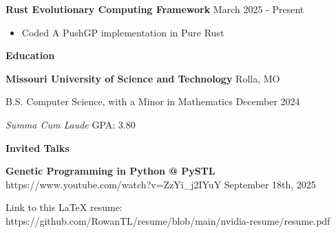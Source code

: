 \documentclass[11pt]{article}
\begin{document}
\textbf{Rust Evolutionary Computing Framework} \hfill March 2025 - Present
\begin{itemize}[noitemsep, topsep=0pt, partopsep=0pt, parsep=0pt, itemsep=0pt]
    \item Coded A PushGP implementation in Pure Rust
\end{itemize}

\begin{center}
    \textbf{Education}
\end{center}
\textbf{Missouri University of Science and Technology} \hfill Rolla, MO

B.S. Computer Science, with a Minor in Mathematics \hfill December 2024

\textit{Summa Cum Laude} \hfill GPA: 3.80

\begin{center}
    \textbf{Invited Talks}
\end{center}

\textbf{Genetic Programming in Python @ PySTL} \tiny{https://www.youtube.com/watch?v=ZzYi\_j2IYuY} \hfill \normalsize{September 18th, 2025}

\begin{center}
    \tiny{Link to this LaTeX resume: https://github.com/RowanTL/resume/blob/main/nvidia-resume/resume.pdf}
\end{center}
\end{document}
